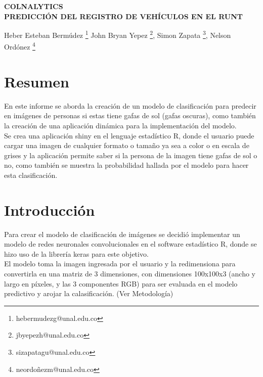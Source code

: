\documentclass[11pt,twoside]{article}
\date{}
\begin{document}
{
	\fancyhead[L]{}
	\fancyfoot[LO,RE]{}
	\fancyfoot[LE,RO]{ \vspace{10pt}\thepage}
	\renewcommand{\headrulewidth}{0pt}
	\renewcommand{\footrulewidth}{0pt}
}

\thispagestyle{firststyle}
\begin{center}
\Large{{\bf COLNALYTICS\\
\vspace{20pt}   PREDICCIÓN DEL REGISTRO DE VEHÍCULOS EN EL RUNT\\ 
\vspace{10pt}}}
\end{center}

{\normalsize{
Heber Esteban Bermúdez			\footnote{\footnotesize{ hebermudezg@unal.edu.co}}
John Bryan Yepez				\footnote{\footnotesize{ jbyepezh@unal.edu.co}},
Simon Zapata 					\footnote{\footnotesize{sizapatagu@unal.edu.co}},
Nelson Ordónez 			\footnote{\footnotesize{neordoñezm@unal.edu.co}}
}}






\section*{Resumen}
\noindent
En este informe se aborda la creación de un modelo de clasificación para predecir en imágenes de personas si estas tiene gafas de sol (gafas oscuras), como también la creación de una aplicación dinámica para la implementación del modelo.\\
Se crea una aplicación shiny en el lenguaje estadístico R,  donde el usuario puede cargar una imagen de cualquier formato o tamaño ya sea a color o en escala de grises y la aplicación permite  saber si la persona de la imagen tiene gafas de sol o no, como también se muestra la probabilidad hallada por el modelo para hacer esta clasificación.

\section*{Introducción}
\noindent
Para crear el modelo de clasificación de imágenes se decidió implementar un modelo de redes neuronales convolucionales en el software estadístico R, donde se hizo uso de la librería keras para este objetivo. \\
\noindent
El modelo toma la imagen ingresada por el usuario y  la redimensiona para convertirla en una  matriz de 3 dimensiones, con dimensiones  100x100x3 (ancho y largo en píxeles, y las 3 componentes RGB) para ser evaluada en el modelo predictivo y arojar la calasificación. (Ver Metodología)
\end{document}
